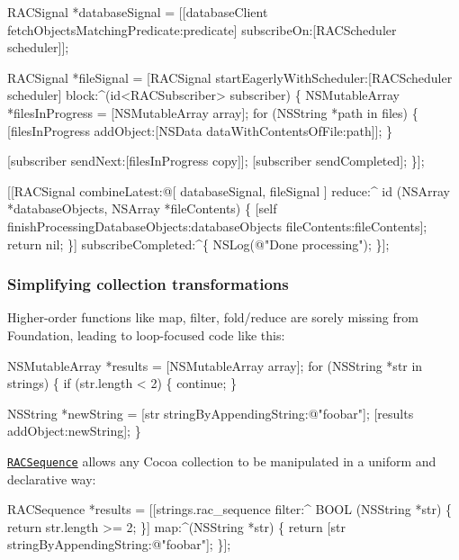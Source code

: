 \begin{DoxyCode}
RACSignal *databaseSignal = [[databaseClient
    fetchObjectsMatchingPredicate:predicate]
    subscribeOn:[RACScheduler scheduler]];

RACSignal *fileSignal = [RACSignal startEagerlyWithScheduler:[RACScheduler scheduler]
       block:^(id<RACSubscriber> subscriber) \{
    NSMutableArray *filesInProgress = [NSMutableArray array];
    for (NSString *path in files) \{
        [filesInProgress addObject:[NSData dataWithContentsOfFile:path]];
    \}

    [subscriber sendNext:[filesInProgress copy]];
    [subscriber sendCompleted];
\}];

[[RACSignal
    combineLatest:@[ databaseSignal, fileSignal ]
    reduce:^ id (NSArray *databaseObjects, NSArray *fileContents) \{
        [self finishProcessingDatabaseObjects:databaseObjects fileContents:fileContents];
        return nil;
    \}]
    subscribeCompleted:^\{
        NSLog(@"Done processing");
    \}];
\end{DoxyCode}


\subsubsection*{Simplifying collection transformations}

Higher-\/order functions like {\ttfamily map}, {\ttfamily filter}, {\ttfamily fold}/{\ttfamily reduce} are sorely missing from Foundation, leading to loop-\/focused code like this\+:


\begin{DoxyCode}
NSMutableArray *results = [NSMutableArray array];
for (NSString *str in strings) \{
    if (str.length < 2) \{
        continue;
    \}

    NSString *newString = [str stringByAppendingString:@"foobar"];
    [results addObject:newString];
\}
\end{DoxyCode}


\href{ReactiveCocoa/RACSequence.h}{\tt R\+A\+C\+Sequence} allows any Cocoa collection to be manipulated in a uniform and declarative way\+:


\begin{DoxyCode}
RACSequence *results = [[strings.rac\_sequence
    filter:^ BOOL (NSString *str) \{
        return str.length >= 2;
    \}]
    map:^(NSString *str) \{
        return [str stringByAppendingString:@"foobar"];
    \}];
\end{DoxyCode}


